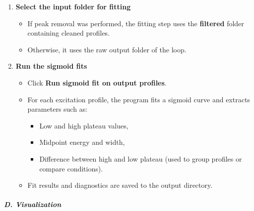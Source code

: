 \begin{enumerate}
\def\labelenumi{\arabic{enumi}.}
\tightlist
\item
  \textbf{Select the input folder for fitting}

  \begin{itemize}
  \tightlist
  \item
    If peak removal was performed, the fitting step uses the
    \textbf{filtered} folder containing cleaned profiles.\\
  \item
    Otherwise, it uses the raw output folder of the loop.
  \end{itemize}
\item
  \textbf{Run the sigmoid fits}

  \begin{itemize}
  \tightlist
  \item
    Click \textbf{Run sigmoid fit on output profiles}.\\
  \item
    For each excitation profile, the program fits a sigmoid curve and
    extracts parameters such as:

    \begin{itemize}
    \tightlist
    \item
      Low and high plateau values,\\
    \item
      Midpoint energy and width,\\
    \item
      Difference between high and low plateau (used to group profiles or
      compare conditions).\\
    \end{itemize}
  \item
    Fit results and diagnostics are saved to the output directory.
  \end{itemize}
\end{enumerate}

\hypertarget{d.-visualization}{%
\subparagraph{D. Visualization}\label{d.-visualization}}

